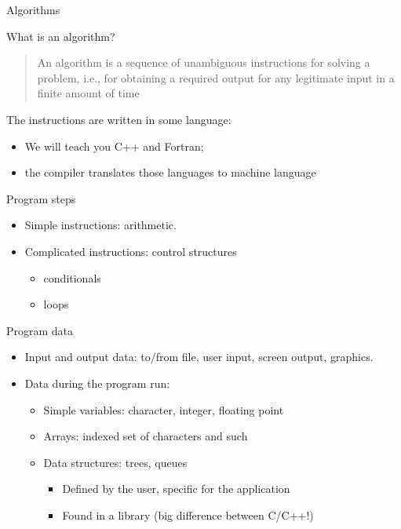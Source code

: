  {Algorithms}

\begin{block}{What is an algorithm?}
  \label{sl:whatalgo}
  \begin{quotation}
    \raggedright\noindent
    An algorithm is a sequence of unambiguous instructions for solving
    a problem, i.e., for obtaining a required output for any
    legitimate input in a finite amount of time\\
  \end{quotation}
  The instructions are written in some language:
  \begin{itemize}
  \item We will teach you C++ and Fortran;
  \item the compiler translates those languages to machine language
  \end{itemize}
\end{block}

\begin{block}{Program steps}
  \label{sl:step-by-step}
  \begin{itemize}
  \item Simple instructions: arithmetic.
  \item Complicated instructions: control structures
    \begin{itemize}
    \item conditionals
    \item loops
    \end{itemize}
  \end{itemize}
\end{block}

\begin{block}{Program data}
  \label{sl:prog-data}
  \begin{itemize}
  \item Input and output data: to/from file, user input, screen
    output, graphics.
  \item Data during the program run:
    \begin{itemize}
    \item Simple variables: character, integer, floating point
    \item Arrays: indexed set of characters and such
    \item Data structures: trees, queues
      \begin{itemize}
      \item Defined by the user, specific for the application
      \item Found in a library (big difference between C/C++!)
      \end{itemize}
    \end{itemize}
  \end{itemize}
\end{block}


